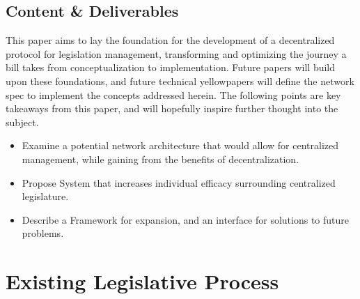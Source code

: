\documentclass[letterpaper,twocolumn]{article}
\begin{document}
\subsection*{Content \& Deliverables}
This paper aims to lay the foundation for the development of a decentralized protocol for legislation management, transforming and optimizing the journey a bill takes from conceptualization to implementation.  Future papers will build upon these foundations, and future technical yellowpapers will define the network spec to implement the concepts addressed herein.  The following points are key takeaways from this paper, and will hopefully inspire further thought into the subject.
\begin{itemize}
\item Examine a potential network architecture that would allow for centralized management, while gaining from the benefits of decentralization.
\item Propose System that increases individual efficacy surrounding centralized legislature.
\item Describe a Framework for expansion, and an interface for solutions to future problems.
\end{itemize}

\section*{Existing Legislative Process}
\end{document}
